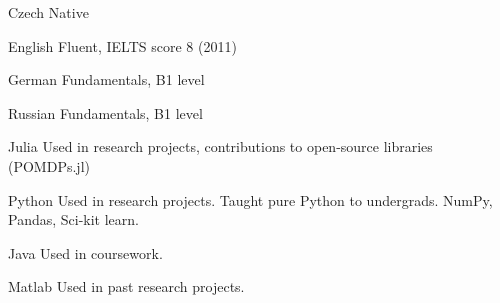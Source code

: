 


\begin{cvskills}

  \cvskill
    {\faCircle \faCircle \faCircle \faCircle \faCircle} %
    {Czech} %
    {Native} %

  \cvskill
    {\faCircle \faCircle \faCircle \faCircle \faCircle} %
    {English} %
    {Fluent, IELTS score 8 (2011)} %

  \cvskill
    {\faCircle \faCircle \faCircleThin \faCircleThin \faCircleThin} %
    {German} %
    {Fundamentals, B1 level} %

  \cvskill
    {\faCircle \faCircle \faCircleThin \faCircleThin \faCircleThin} %
    {Russian} %
    {Fundamentals, B1 level} %

\end{cvskills}


\begin{cvskills}

  \cvskill
    {\faCircle \faCircle \faCircle \faCircle \faCircleThin} %
    {Julia} %
    {Used in research projects, contributions to open-source libraries (POMDPs.jl)} %

  \cvskill
    {\faCircle \faCircle \faCircle \faCircle \faCircleThin} %
    {Python} %
    {Used in research projects. Taught pure Python to undergrads. NumPy, Pandas, Sci-kit learn. } %

  \cvskill
    {\faCircle \faCircle \faCircle \faCircleThin \faCircleThin} %
    {Java} %
    {Used in coursework. } %

  \cvskill
    {\faCircle \faCircle \faCircle \faCircleThin \faCircleThin} %
    {Matlab} %
    {Used in past research projects. } %

\end{cvskills}


